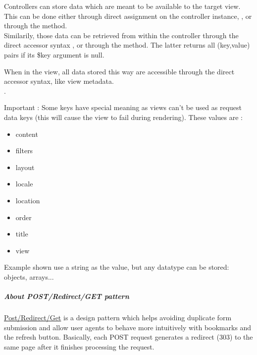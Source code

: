 \documentclass[pdftex,12pt,a4paper]{article}
\begin{document}
Controllers can store data which are meant to be available to the target view.\\
This can be done either through direct assignment on the controller instance, \eg{} , or through the  method.\\
Similarily, those data can be retrieved from within the controller through the direct accessor syntax , or through the  method. The latter returns all (key,value) pairs if its \$key argument is null.

When in the view, all data stored this way are accessible through the direct accessor syntax, like view metadata.\\
.

Important : Some keys have special meaning as views can't be used as request data keys (this will cause the view to fail during rendering). These values are :
\begin{itemize}
	\item content
	\item filters
	\item layout
	\item locale
	\item location
	\item order
	\item title
	\item view
\end{itemize}

\begin{note}
Example shown use a string as the value, but any datatype can be stored: objects, arrays...
\end{note}

\subparagraph{About POST/Redirect/GET pattern}
\href{http://en.wikipedia.org/wiki/Post/Redirect/Get}{Post/Redirect/Get} is a design pattern which helps avoiding duplicate form submission and allow user agents to behave more intuitively with bookmarks and the refresh button. Basically, each POST request generates a redirect (303) to the same page after it finishes processing the request.
\end{document}

